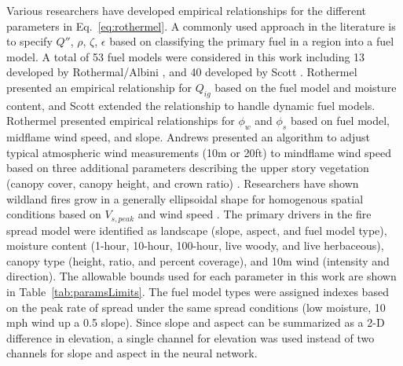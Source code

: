 \documentclass[smallcondensed]{svjour3}     %
\begin{document}
Various researchers have developed empirical relationships for the
different parameters in Eq.~\ref{eq:rothermel}. A commonly used approach
in the literature is to specify $Q''$, $\rho$, $\zeta$, $\epsilon$
based on classifying the primary fuel in a region into a fuel model.
A total of 53 fuel models were considered in this work including
13 developed by Rothermal/Albini \cite{rothermel1972mathematical,albini1976estimating},
and 40 developed by Scott \cite{scott2005standard}. Rothermel presented
an empirical relationship for $Q_{ig}$ based on the fuel model and
moisture content, and Scott extended the relationship to handle dynamic
fuel models. Rothermel presented empirical relationships for $\phi_{w}$
and $\phi_{s}$ based on fuel model, midflame wind speed, and slope.
Andrews presented an algorithm to adjust typical atmospheric wind
measurements (10m or 20ft) to mindflame wind speed based on three
additional parameters describing the upper story vegetation
(canopy cover, canopy height, and crown ratio)
\cite{andrews2012modeling}. Researchers have shown wildland fires grow
in a generally ellipsoidal shape for homogenous spatial conditions
based on $V_{s,peak}$ and wind speed
\cite{finney1999mechanistic,wagner1969simple,green1983fire}.
The primary drivers in the fire spread model were identified as
landscape (slope, aspect, and fuel model type),
moisture content (1-hour, 10-hour, 100-hour, live woody, and live herbaceous),
canopy type (height, ratio, and percent coverage),
and 10m wind (intensity and direction). The allowable bounds used for
each parameter in this work are shown in Table~\ref{tab:paramsLimits}.
The fuel model types were assigned indexes based on the peak rate of spread
under the same spread conditions (low moisture, 10 mph wind up a 0.5 slope).
Since slope and aspect can be summarized as a 2-D difference in elevation,
a single channel for elevation was used instead of two channels for slope
and aspect in the neural network.
\end{document}
